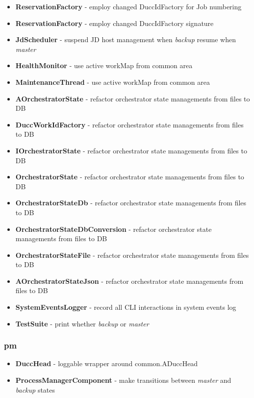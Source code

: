 \documentclass[letterpaper]{article}
\begin{document}
{\begin{itemize}
  \item \textbf{ReservationFactory} - employ changed DuccIdFactory for Job numbering\item \textbf{ReservationFactory} - employ changed DuccIdFactory signature
  \item \textbf{JdScheduler} - suspend JD host management when {\em backup} resume when {\em master}
  \item \textbf{HealthMonitor} - use active workMap from common area
  \item \textbf{MaintenanceThread} - use active workMap from common area
  \item \textbf{AOrchestratorState} - refactor orchestrator state managements from files to DB
  \item \textbf{DuccWorkIdFactory} - refactor orchestrator state managements from files to DB
  \item \textbf{IOrchestratorState} - refactor orchestrator state managements from files to DB
  \item \textbf{OrchestratorState} - refactor orchestrator state managements from files to DB
  \item \textbf{OrchestratorStateDb} - refactor orchestrator state managements from files to DB
  \item \textbf{OrchestratorStateDbConversion} - refactor orchestrator state managements from files to DB
  \item \textbf{OrchestratorStateFile} - refactor orchestrator state managements from files to DB
  \item \textbf{AOrchestratorStateJson} - refactor orchestrator state managements from files to DB
  \item \textbf{SystemEventsLogger} - record all CLI interactions in system events log
  \item \textbf{TestSuite} - print whether {\em backup} or {\em master}
\end{itemize}
}

\subsubsection{pm}

{\renewcommand\labelitemi{}
\begin{itemize}
  \item \textbf{DuccHead} - loggable wrapper around common.ADuccHead
  \item \textbf{ProcessManagerComponent} - make transitions between {\em master} and {\em backup} states
\end{itemize}
}
\end{document}

